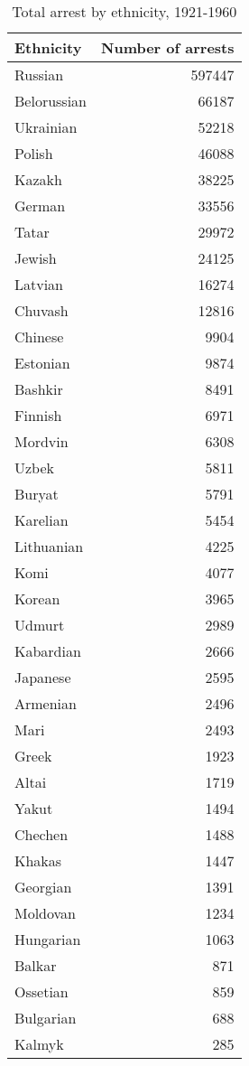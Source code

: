 \begin{table}[t]

\caption{\label{tab:total_arrests_by_ethnicity}Total arrest by ethnicity, 1921-1960}
\centering
\fontsize{7}{9}\selectfont
\begin{tabular}{lr}
\toprule
Ethnicity & Number of arrests\\
\midrule
Russian & 597447\\
Belorussian & 66187\\
Ukrainian & 52218\\
Polish & 46088\\
Kazakh & 38225\\
German & 33556\\
Tatar & 29972\\
Jewish & 24125\\
Latvian & 16274\\
Chuvash & 12816\\
Chinese & 9904\\
Estonian & 9874\\
Bashkir & 8491\\
Finnish & 6971\\
Mordvin & 6308\\
Uzbek & 5811\\
Buryat & 5791\\
Karelian & 5454\\
Lithuanian & 4225\\
Komi & 4077\\
Korean & 3965\\
Udmurt & 2989\\
Kabardian & 2666\\
Japanese & 2595\\
Armenian & 2496\\
Mari & 2493\\
Greek & 1923\\
Altai & 1719\\
Yakut & 1494\\
Chechen & 1488\\
Khakas & 1447\\
Georgian & 1391\\
Moldovan & 1234\\
Hungarian & 1063\\
Balkar & 871\\
Ossetian & 859\\
Bulgarian & 688\\
Kalmyk & 285\\
\bottomrule
\end{tabular}
\end{table}